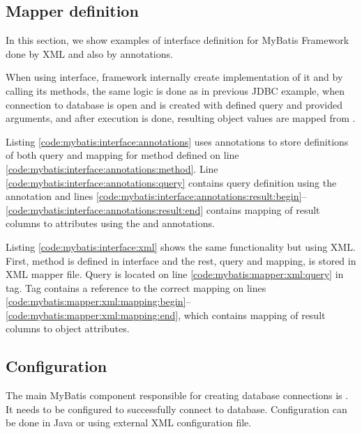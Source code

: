 \subsection{Mapper definition \label{frameworks:myBatis:mapper}}

In this section, we show examples of  interface definition
for MyBatis Framework done by XML and also by annotations.

When using  interface, framework internally create implementation
of it and by calling its methods, the same logic is done as
in previous JDBC example, when connection to database is open
and  is created with defined query and provided arguments,
and after execution is done, resulting object values are mapped from .

Listing \ref{code:mybatis:interface:annotations} uses annotations to store definitions
of both query and mapping for method  defined on line
\ref{code:mybatis:interface:annotations:method}. Line \ref{code:mybatis:interface:annotations:query}
contains query definition using the  annotation and lines
\ref{code:mybatis:interface:annotations:result:begin}--\ref{code:mybatis:interface:annotations:result:end}
contains mapping of result columns to  attributes
using the  and  annotations.


Listing \ref{code:mybatis:interface:xml} shows the same functionality but using XML.
First, method  is defined in interface and the rest,
query and mapping, is stored in XML mapper file.
Query is located on line \ref{code:mybatis:mapper:xml:query} in  tag.
Tag contains a reference to the correct  mapping on lines
\ref{code:mybatis:mapper:xml:mapping:begin}--\ref{code:mybatis:mapper:xml:mapping:end},
which contains mapping of result columns to  object attributes.




\subsection{Configuration \label{frameworks:myBatis:configuration}}

The main MyBatis component responsible for creating database connections
is . It needs to be configured to successfully connect
to database. Configuration can be done in Java or using external XML configuration file.

